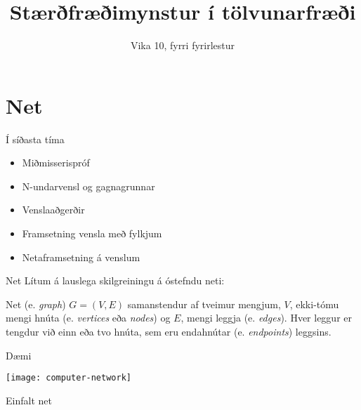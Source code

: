\documentclass{beamer}
\title{Stærðfræðimynstur í tölvunarfræði}
\subtitle{Vika 10, fyrri fyrirlestur}
\begin{document}
\begin{frame}
\titlepage
\end{frame}


\section{Net}

\begin{frame}{Í síðasta tíma}
\begin{itemize}
 \item Miðmisserispróf
 \item N-undarvensl og gagnagrunnar
 \item Venslaaðgerðir
 \item Framsetning vensla með fylkjum
 \item Netaframsetning á venslum
\end{itemize}
\end{frame}

\begin{frame}{Net}
Lítum á lauslega skilgreiningu á óstefndu neti:

\begin{tcolorbox}[title=Net]
Net (e. \emph{graph}) $G = (V, E)$ samanstendur af tveimur mengjum, $V$, ekki-tómu mengi hnúta (e. \emph{vertices} eða \emph{nodes}) og $E$, mengi leggja (e. \emph{edges}). Hver leggur er tengdur við einn eða tvo hnúta, sem eru endahnútar (e. \emph{endpoints}) leggsins.
\end{tcolorbox}
\end{frame}

\begin{frame}{Dæmi}
\begin{center}
\texttt{[image: computer-network]}

Einfalt net
\end{center}
\end{frame}
\end{document}
